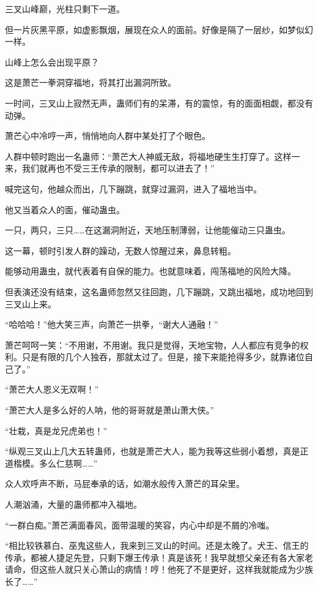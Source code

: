 
\begin{this_body}

三叉山峰巅，光柱只剩下一道。

但一片灰黑平原，如虚影飘烟，展现在众人的面前。好像是隔了一层纱，如梦似幻一样。

山峰上怎么会出现平原？

这是萧芒一拳洞穿福地，将其打出漏洞所致。

一时间，三叉山上寂然无声，蛊师们有的呆滞，有的震惊，有的面面相觑，都没有动弹。

萧芒心中冷哼一声，悄悄地向人群中某处打了个眼色。

人群中顿时跑出一名蛊师：“萧芒大人神威无敌，将福地硬生生打穿了。这样一来，我们就再也不受三王传承的限制，都可以进去了！”

喊完这句，他越众而出，几下蹦跳，就穿过漏洞，进入了福地当中。

他又当着众人的面，催动蛊虫。

一只，两只，三只……在这漏洞附近，天地压制薄弱，让他能催动三只蛊虫。

这一幕，顿时引发人群的躁动，无数人惊醒过来，鼻息转粗。

能够动用蛊虫，就代表着有自保的能力。也就意味着，闯荡福地的风险大降。

但表演还没有结束，这名蛊师忽然又往回跑，几下蹦跳，又跳出福地，成功地回到三叉山上来。

“哈哈哈！”他大笑三声，向萧芒一拱拳，“谢大人通融！”

萧芒呵呵一笑：“不用谢，不用谢。我只是觉得，天地宝物，人人都应有竞争的权利。只是有限的几个人独吞，那就太过了。但是，接下来能抢得多少，就靠诸位自己了。”

“萧芒大人恩义无双啊！”

“萧芒大人是多么好的人呐，他的哥哥就是萧山萧大侠。”

“壮栽，真是龙兄虎弟也！”

“纵观三叉山上几大五转蛊师，也就是萧芒大人，能为我等这些弱小着想，真是正道楷模。多么仁慈啊……”

众人欢呼声不断，马屁奉承的话，如潮水般传入萧芒的耳朵里。

人潮汹涌，大量的蛊师都冲入福地。

“一群白痴。”萧芒满面春风，面带温暖的笑容，内心中却是不屑的冷嗤。

“相比较铁慕白、巫鬼这些人，我来到三叉山的时间。还是太晚了。犬王、信王的传承，都被人捷足先登，只剩下爆王传承！真是该死！我早就想父亲还有各大家老请命，但这些人就只关心萧山的病情！哼！他死了不是更好，这样我就能成为少族长了……”


\end{this_body}

